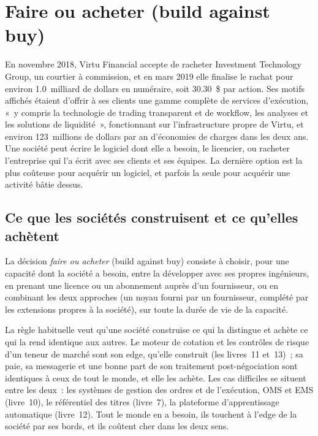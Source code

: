 \chapter{Faire ou acheter (build against buy)}\label{ch:fm:build-against-buy}

En novembre 2018, Virtu Financial accepte de racheter Investment Technology Group, un courtier à commission, et en mars 2019 elle finalise le rachat pour environ
1.0~milliard de dollars en numéraire, soit 30.30~\$ par action. Ses motifs affichés étaient d'offrir à ses clients une gamme complète de services d'exécution, «~y compris
la technologie de trading transparent et de workflow, les analyses et les solutions de liquidité~», fonctionnant sur l'infrastructure propre de Virtu, et environ 123~millions de dollars par an d'économies de
charges dans les deux ans. Une société peut écrire le logiciel dont elle a besoin, le licencier, ou racheter l'entreprise qui l'a écrit avec ses clients
et ses équipes. La dernière option est la plus coûteuse pour acquérir un logiciel, et parfois la seule pour acquérir une activité bâtie dessus.

\section{Ce que les sociétés construisent et ce qu'elles achètent}

\begin{definition}\label{def:fm:build-against-buy:bab}
La décision \emph{faire ou acheter} (build against buy) consiste à choisir, pour une capacité dont la société a besoin, entre la développer avec ses propres
ingénieurs, en prenant une licence ou un abonnement auprès d'un fournisseur, ou en combinant les deux approches (un noyau fourni par un fournisseur, complété par les extensions propres à la société), sur
toute la durée de vie de la capacité.
\end{definition}

La règle habituelle veut qu'une société construise ce qui la distingue et achète ce qui la rend identique aux autres. Le moteur de cotation et les contrôles de risque d'un teneur de marché sont
son edge, qu'elle construit (les livres~11 et~13)~; sa paie, sa messagerie et une bonne part de son traitement post-négociation sont identiques à ceux de tout le monde, et elle
les achète. Les cas difficiles se situent entre les deux~: les systèmes de gestion des ordres et de l'exécution, OMS et EMS (livre~10), le référentiel des titres (livre~7), la plateforme d'apprentissage
automatique (livre~12). Tout le monde en a besoin, ils touchent à l'edge de la société par ses bords, et ils coûtent cher dans les deux sens.

